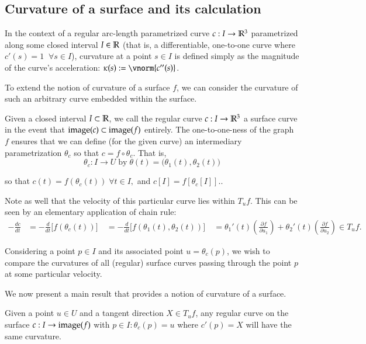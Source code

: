 \subsection{Curvature of a surface and its calculation}
In the context of a regular arc-length parametrized curve $c: I \to \mathbb{R}^3$ parametrized along some closed interval $I\in \mathbb{R}$
 (that is, a differentiable, one-to-one curve where $c'(s) = 1 \;\; \forall s \in I$), curvature at a point $s \in I$ is defined simply as the magnitude of the curve's acceleration: $\kappa(s) := \vnorm{c''(s)}$.
 
 To extend the notion of curvature of a surface $f$, we can consider the curvature of such an arbitrary curve embedded within the surface.
 
 \begin{defn} \label{def:curve-on-a-surface}
 	Given a closed interval $I \subset \mathbb{R}$, we call the regular curve
 	$c: I \to \mathbb{R}^3$ a surface curve in the event that $\mathrm{image}(c) \subset \mathrm{image}(f)$ entirely. The one-to-one-ness of the graph $f$ ensures that we can define (for the given curve) an intermediary parametrization $\theta_c$  so that
 	$ c = f \circ \theta_c $. That is,
 	\[
 	\theta_c : I \to U \; \textrm{by} \; \theta(t) = \big(\theta_1(t), \theta_2(t)\big)
 	\]
 	
 	so that $c(t) = f(\theta_c(t)) \;\forall t\in I,$
 	and $c[I] = f\left[\theta_c[I]\right].$.
 \end{defn}
 Note as well that the velocity of this particular curve lies within $T_u f$. This
 can be seen by an elementary application of chain rule:
 \begin{align}
 -\frac{d c}{dt} &= -\frac{d}{dt}\big[ f(\theta_c(t))\big] \
 &= -\frac{d}{dt}\big[f(\theta_1(t), \theta_2(t))\big] \
 &= \theta_1'(t)\left( \frac{\partial f}{\partial u_1} \right) + 
 \theta_2'(t)\left( \frac{\partial f}{\partial u_2} \right) \in T_uf.
 \end{align}
 
 Considering a point $p \in I$ and its associated point $u = \theta_c(p)$, we wish to compare the curvatures of all (regular) surface curves passing through the point $p$ at some particular velocity.
 
 We now present a main result that provides a notion of curvature of a surface.

	\begin{theorem}[Theorem of Meusnier] \label{thm:meusnier}
		Given a point $u \in U $ and a tangent direction $X \in T_u f$,
  any regular curve on the surface $c: I \to \mathrm{image}(f)$ with $p\in I : \theta_c(p) = u$
  where $c'(p) = X$ will have the same curvature.
	\end{theorem}
	
